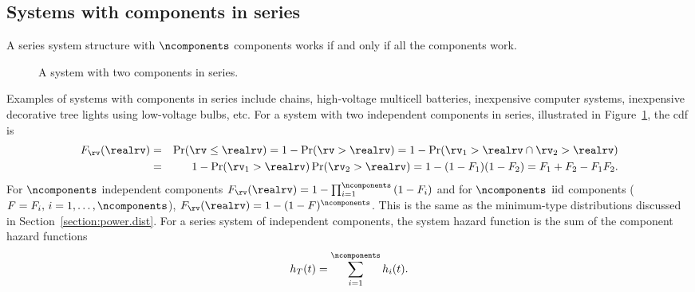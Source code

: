 
\subsection{Systems with components in series}
\label{section:system.series}
A series system structure with $\ncomponents$ components works if
and only if all the components work. 
\begin{figure}
\caption{A system with two components in
series.}
\label{figure:system.seriesfig.ps}
\end{figure}
Examples of systems with components in series include chains,
high-voltage multicell batteries, inexpensive computer systems,
inexpensive decorative tree lights using low-voltage bulbs, etc.  For
a system with 
two independent components in series, illustrated in
Figure~\ref{figure:system.seriesfig.ps}, the cdf is
\begin{eqnarray}
\label{equation:two.comp.series}
F_{\rv}(\realrv)&=&\Pr( \rv \le \realrv)
=1-\Pr( \rv > \realrv)=1-\Pr(\rv_{1} > \realrv \cap \rv_{2} > \realrv)
\\ \nonumber
&=&1-\Pr(\rv_{1} > \realrv) \Pr(\rv_{2} > \realrv)
=1-(1-F_{1})(1-F_{2})=  F_{1} + F_{2} -  F_{1}F_{2} .
\end{eqnarray}
For $\ncomponents$ independent components $F_{\rv}(\realrv)=
1-\prod_{i=1}^{\ncomponents} \left (1-F_{i} \right )$ and for
$\ncomponents$ ${\rm iid}$ components ($F=F_{i}, \, i=1, \ldots,
\ncomponents$), $F_{\rv}(\realrv)= 1-(1-F)^{\ncomponents}$.
This is the same as the minimum-type distributions discussed in
Section~\ref{section:power.dist}.  For a series system of independent
components, the system hazard function is the sum of the
component hazard functions
\begin{equation}
\label{equation:sum.hazard}
h_{T}(t) = \sum_{i=1}^{\ncomponents} h_{i}(t).
\end{equation}

